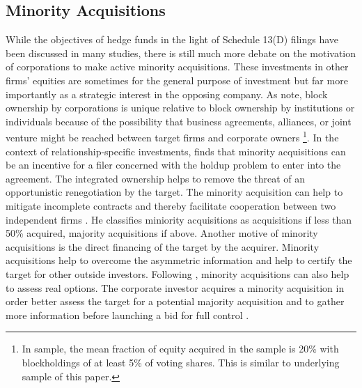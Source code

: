 \documentclass[12pt]{article}
\begin{document}
\subsection{Minority Acquisitions}

While the objectives of hedge funds in the light of Schedule 13(D) filings  have been discussed in many studies, there is still much more debate on the motivation of corporations to make active minority acquisitions. These investments in other firms' equities are sometimes for the general purpose of investment but far more importantly as a strategic interest in the opposing company. As \citet{Allen2000} note, block ownership by corporations is unique relative to block ownership by institutions or individuals because of the possibility that business agreements, alliances, or joint venture might be reached between target firms and corporate owners
	\footnote{In \citet{Allen2000}sample, the mean fraction of equity acquired in the sample is 20\% with blockholdings of at least 5\% of voting shares. This is similar to underlying sample of this paper.}. 
In the context of relationship-specific investments, \citet{Ouimet2013} finds that minority acquisitions can be an incentive for a filer concerned with the holdup problem to enter into the agreement. The integrated ownership helps to remove the threat of an opportunistic renegotiation by the target. The minority acquisition can help to mitigate incomplete contracts and thereby facilitate cooperation between two independent firms \citep{Allen2000}. He classifies miniority acquisitions as acquisitions if less than 50\% acquired, majority acquisitions if above. Another motive of minority acquisitions \citet{Ouimet2013} is the direct financing of the target by the acquirer. Minority acquisitions help to overcome the asymmetric information and help to certify the target for other outside investors. Following \citet{Ouimet2013}, minority acquisitions can also help to assess real options. The corporate investor acquires a minority acquisition in order better assess the target for a potential majority acquisition and to gather more information before launching a bid for full control \citep{Huang2017}. 
\end{document}
